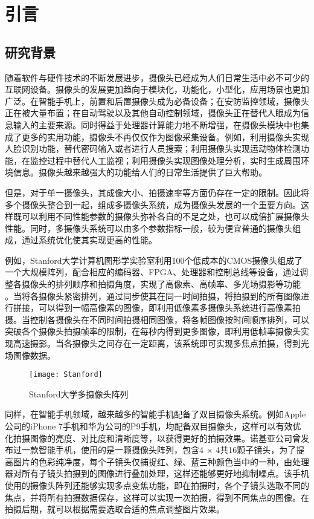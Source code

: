 \chapter{引言}


\section{研究背景}

随着软件与硬件技术的不断发展进步，摄像头已经成为人们日常生活中必不可少的互联网设备。摄像头的发展更加趋向于模块化，功能化，小型化，应用场景也更加广泛。在智能手机上，前置和后置摄像头成为必备设备；在安防监控领域，摄像头正在被大量布置；在自动驾驶以及其他自动控制领域，摄像头正在替代人眼成为信息输入的主要来源。同时得益于处理器计算能力地不断增强，在摄像头模块中也集成了更多的实用功能，摄像头不再仅仅作为图像采集设备。例如，利用摄像头实现人脸识别功能，替代密码输入或者进行人员搜索；利用摄像头实现运动物体检测功能，在监控过程中替代人工监视；利用摄像头实现图像处理分析，实时生成周围环境信息。摄像头越来越强大的功能给人们的日常生活提供了巨大帮助。

但是，对于单一摄像头，其成像大小、拍摄速率等方面仍存在一定的限制。因此将多个摄像头整合到一起，组成多摄像头系统，成为摄像头发展的一个重要方向。这样既可以利用不同性能参数的摄像头弥补各自的不足之处，也可以成倍扩展摄像头性能。同时，多摄像头系统可以由多个参数指标一般，较为便宜普通的摄像头组成，通过系统优化使其实现更高的性能。

例如，Stanford大学计算机图形学实验室利用100个低成本的CMOS摄像头组成了一个大规模阵列，配合相应的编码器、FPGA、处理器和控制总线等设备，通过调整各摄像头的排列顺序和拍摄角度，实现了高像素、高帧率、多光场摄影等功能 \cite{1}。当将各摄像头紧密排列，通过同步使其在同一时间拍摄，将拍摄到的所有图像进行拼接，可以得到一幅高像素的图像，即利用低像素多摄像头系统进行高像素拍摄。当控制各摄像头在不同时间拍摄相同图像，将各帧图像按时间顺序排列，可以突破各个摄像头拍摄帧率的限制，在每秒内得到更多图像，即利用低帧率摄像头实现高速摄影。当各摄像头之间存在一定距离，该系统即可实现多焦点拍摄，得到光场图像数据。

\begin{figure}[h] 
  \centering
  \texttt{[image: Stanford]}
  \caption{Stanford大学多摄像头阵列}
  \label{Stanford}
\end{figure}


同样，在智能手机领域，越来越多的智能手机配备了双目摄像头系统。例如Apple公司的iPhone 7手机和华为公司的P9手机，均配备双目摄像头，这样可以有效优化拍摄图像的亮度、对比度和清晰度等，以获得更好的拍摄效果。诺基亚公司曾发布过一款智能手机，使用的是一颗摄像头阵列，包含4 × 4共16颗子镜头，为了提高图片的色彩纯净度，每个子镜头仅捕捉红、绿、蓝三种颜色当中的一种，由处理器对所有子镜头拍摄到的图像进行叠加处理，这样还能够更好地抑制噪点。该手机使用的摄像头阵列还能够实现多点变焦功能，即在拍摄时，各个子镜头选取不同的焦点，并将所有拍摄数据保存，这样可以实现一次拍摄，得到不同焦点的图像。在拍摄后期，就可以根据需要选取合适的焦点调整图片效果。

